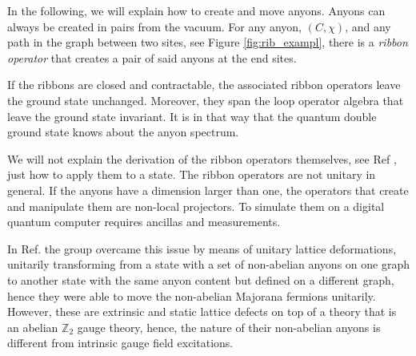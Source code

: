 \documentclass[two column]{article}
\newcommand{\jovan}[1]{\textcolor{blue}{[#1]}}
\begin{document}
In the following, we will explain how to create and move anyons. Anyons can always be created in pairs from the vacuum. 
%
%
%
For any anyon, $(C, \chi)$, and any path in the graph between two sites, see Figure \ref{fig:rib_exampl}, there is a \emph{ribbon operator} that creates a pair of said anyons at the end sites. 

If the ribbons are closed and contractable, the associated ribbon operators leave the ground state unchanged. Moreover, they span the loop operator algebra that leave the ground state invariant. It is in that way that the quantum double ground state knows about the anyon spectrum.

We will not explain the derivation of the ribbon operators themselves, see Ref \cite{Kitaev_2003,cui2018topological}, just how to apply them to a state.
%
%
The ribbon operators are not unitary in general. If the anyons have a dimension larger than one, the operators that create and manipulate them are non-local projectors. To simulate them on a digital quantum computer requires ancillas and measurements\cite{Cirac}. 

In Ref. \cite{andersen2022observation} the group overcame this issue by means of unitary lattice deformations, unitarily transforming from a state with a set of non-abelian anyons on one graph to another state with the same anyon content but defined on a different graph, hence they were able to move the non-abelian Majorana fermions unitarily. However, these are extrinsic and static lattice defects on top of a theory that is an abelian $\mathbb Z_2$ gauge theory, hence, the nature of their non-abelian anyons is different from intrinsic gauge field excitations.
\end{document}

